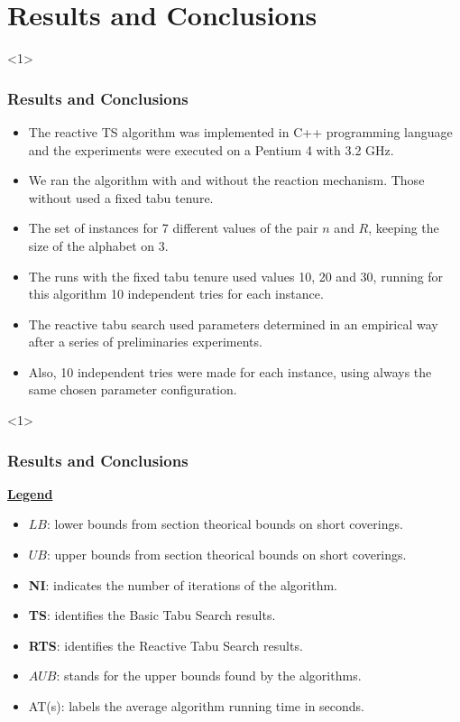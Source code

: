 \documentclass{beamer}
\begin{document}
\section{Results and Conclusions}

\begin{frame}<1>
  \frametitle{Results and Conclusions}

{ 
	\footnotesize
  \begin{itemize}
  	\item The reactive TS algorithm was implemented in C++ programming language and the experiments were executed on a Pentium 4 with 3.2 GHz.
  	
  	\item We ran the algorithm with and without the reaction mechanism. Those without used a fixed tabu tenure.
  	
  	\item The set of instances for 7 different values of the pair $n$ and $R$, keeping the size of the
alphabet on $3$.

  	\item The runs with the fixed tabu tenure used values 10, 20 and 30, running for this algorithm 10 independent tries for each instance.
  	
  	\item The reactive tabu search used parameters determined in an empirical way after a series of preliminaries experiments.

		\item Also, 10 independent tries were made for each instance, using always the same chosen parameter configuration.
  
  \end{itemize}

}
\end{frame}


\begin{frame}<1>
  \frametitle{Results and Conclusions}

{ 
	\footnotesize
  \begin{block}
  
\underline{\bf Legend}
  \begin{itemize}
  	\item $LB$: lower bounds from section theorical bounds on short coverings.
  	\item $UB$: upper bounds from section theorical bounds on short coverings.
  	\item \textbf{NI}: indicates the number of iterations of the algorithm.
  	\item \textbf{TS}: identifies the Basic Tabu Search results.
  	\item \textbf{RTS}: identifies the Reactive Tabu Search results. 
  	\item $AUB$: stands for the upper bounds found by the algorithms.
  	\item AT(s): labels the average algorithm running time in seconds.

  \end{itemize}
  \end{block}

}
\end{frame}
\end{document}
